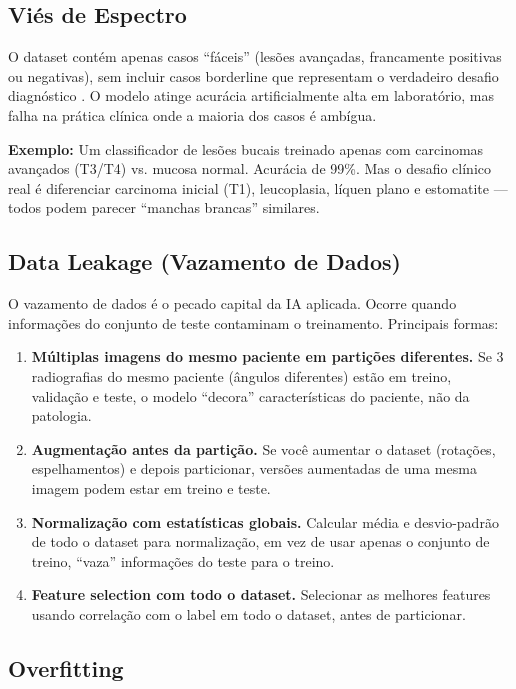 \subsection{Viés de Espectro}

O dataset contém apenas casos ``fáceis'' (lesões avançadas, francamente positivas ou negativas), sem incluir casos borderline que representam o verdadeiro desafio diagnóstico . O modelo atinge acurácia artificialmente alta em laboratório, mas falha na prática clínica onde a maioria dos casos é ambígua.

\textbf{Exemplo:} Um classificador de lesões bucais treinado apenas com carcinomas avançados (T3/T4) vs. mucosa normal. Acurácia de 99\%. Mas o desafio clínico real é diferenciar carcinoma inicial (T1), leucoplasia, líquen plano e estomatite — todos podem parecer ``manchas brancas'' similares.

\subsection{Data Leakage (Vazamento de Dados)}

O vazamento de dados  é o pecado capital da IA aplicada. Ocorre quando informações do conjunto de teste contaminam o treinamento. Principais formas:

\begin{enumerate}
    \item \textbf{Múltiplas imagens do mesmo paciente em partições diferentes.} Se 3 radiografias do mesmo paciente (ângulos diferentes) estão em treino, validação e teste, o modelo ``decora'' características do paciente, não da patologia.
    \item \textbf{Augmentação antes da partição.} Se você aumentar o dataset (rotações, espelhamentos) e depois particionar, versões aumentadas de uma mesma imagem podem estar em treino e teste.
    \item \textbf{Normalização com estatísticas globais.} Calcular média e desvio-padrão de todo o dataset para normalização, em vez de usar apenas o conjunto de treino, ``vaza'' informações do teste para o treino.
    \item \textbf{Feature selection com todo o dataset.} Selecionar as melhores features usando correlação com o label em todo o dataset, antes de particionar.
\end{enumerate}

\subsection{Overfitting}

